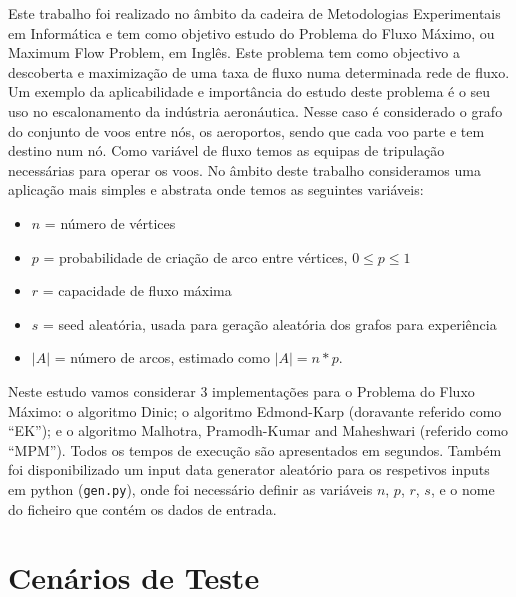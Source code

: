 \documentclass{uofa-eng-assignment}
\begin{document}
Este trabalho foi realizado no âmbito da cadeira de Metodologias Experimentais em Informática e tem como objetivo estudo do Problema do Fluxo Máximo, ou Maximum Flow Problem, em Inglês. Este problema tem como objectivo a descoberta e maximização de uma taxa de fluxo numa determinada rede de fluxo. Um exemplo da aplicabilidade e importância do estudo deste problema é o seu uso no escalonamento da indústria aeronáutica. Nesse caso é considerado o grafo do conjunto de voos entre nós, os aeroportos, sendo que cada voo parte e tem destino num nó. Como variável de fluxo temos as equipas de tripulação necessárias para operar os voos.
No âmbito deste trabalho consideramos uma aplicação mais simples e abstrata onde temos as seguintes variáveis:
\begin{itemize}
\item $n$ = número de vértices
\item $p$ = probabilidade de criação de arco entre vértices, $0 \leq p \leq 1$
\item $r$ = capacidade de fluxo máxima
\item $s$ = seed aleatória, usada para geração aleatória dos grafos para experiência
\item $|A|$ = número de arcos, estimado como $|A|=n*p$.
\end{itemize}
Neste estudo vamos considerar 3 implementações para o Problema do Fluxo Máximo: o algoritmo Dinic; o algoritmo Edmond-Karp (doravante referido como ``EK''); e o algoritmo Malhotra, Pramodh-Kumar and Maheshwari (referido como ``MPM'').
Todos os tempos de execução são apresentados em segundos.
Também foi disponibilizado um input data generator aleatório para os respetivos inputs em python (\texttt{gen.py}), onde foi necessário definir as variáveis $n$, $p$, $r$, $s$, e o nome do ficheiro que contém os dados de entrada.

\section{Cenários de Teste }
\end{document}
